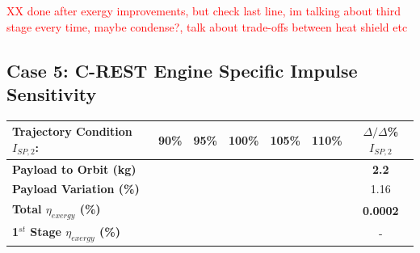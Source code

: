 \textcolor{red}{XX done after exergy improvements, but check last line, im talking about third stage every time, maybe condense?, talk about trade-offs between heat shield etc}

\subsection{Case 5: C-REST Engine Specific Impulse Sensitivity}\label{sec:ispsensitivitynoflyback}

\begin{table}[ht!]
	\centering
	\begin{tabular}{l c c c c c c} 
		\hline \textbf{Trajectory Condition}   \qquad  $I_{SP,2}$:
		&90\%
		&95\%
		&100\%
		&105\%
		&110\%
		& $\Delta/\Delta$\%$I_{SP,2}$
		\\
		\hline \textbf{Payload to Orbit (kg)}
		& \textbf{\PayloadToOrbitIspNinetyNoReturn}
		& \textbf{\PayloadToOrbitIspNinetyFiveNoReturn}
		& \textbf{\PayloadToOrbitIspStandardNoReturn}
		& \textbf{\PayloadToOrbitIspOneHundredFiveNoReturn}
		& \textbf{\PayloadToOrbitIspOneHundredTenNoReturn}
		&\textbf{2.2}
		\\
		\textbf{Payload Variation (\%)}
		& \PayloadVarIspNinetyNoReturn
		& \PayloadVarIspNinetyFiveNoReturn
		& \PayloadVarIspStandardNoReturn
		& \PayloadVarIspOneHundredFiveNoReturn
		& \PayloadVarIspOneHundredTenNoReturn
		&1.16
		\\
		\textbf{Total $\eta_{exergy}$ (\%)}
		& \textbf{\totalExergyEffIspNinetyNoReturn}
		& \textbf{\totalExergyEffIspNinetyFiveNoReturn}
		& \textbf{\totalExergyEffIspStandardNoReturn}
		& \textbf{\totalExergyEffIspOneHundredFiveNoReturn}
		& \textbf{\totalExergyEffIspOneHundredTenNoReturn}
		& \textbf{0.0002}
		\\
		\hline 
		\textbf{1$^{st}$ Stage $\eta_{exergy}$ (\%)}
		& \textbf{\firstExergyEffIspNinetyNoReturn}
		& \textbf{\firstExergyEffIspNinetyFiveNoReturn}
		& \textbf{\firstExergyEffIspStandardNoReturn}
		& \textbf{\firstExergyEffIspOneHundredFiveNoReturn}
		& \textbf{\firstExergyEffIspOneHundredTenNoReturn}
		& -
		\\


\end{tabular}
\end{table}
